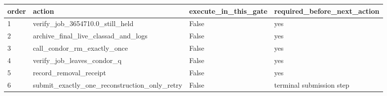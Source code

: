 \begin{tabular}{llll}
\toprule
order & action & execute\_in\_this\_gate & required\_before\_next\_action \\
\midrule
1 & verify\_job\_3654710.0\_still\_held & False & yes \\
2 & archive\_final\_live\_classad\_and\_logs & False & yes \\
3 & call\_condor\_rm\_exactly\_once & False & yes \\
4 & verify\_job\_leaves\_condor\_q & False & yes \\
5 & record\_removal\_receipt & False & yes \\
6 & submit\_exactly\_one\_reconstruction\_only\_retry & False & terminal submission step \\
\bottomrule
\end{tabular}
